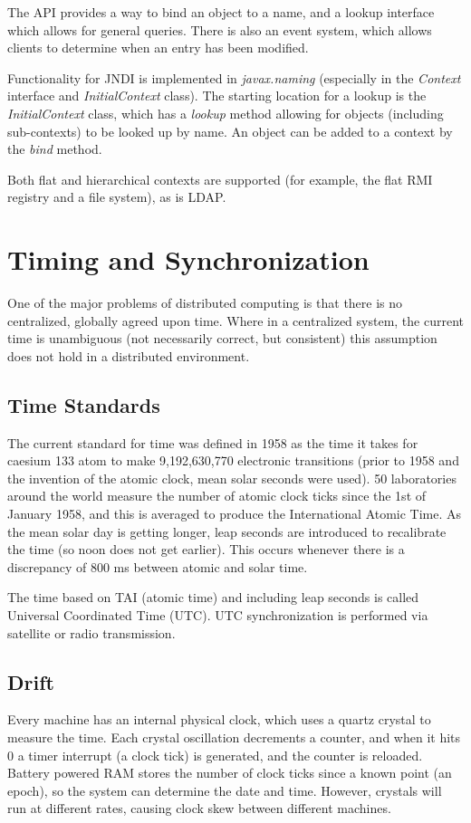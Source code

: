 \documentclass{article}
\begin{document}
The API provides a way to bind an object to a name, and a lookup interface which allows for general queries. There is also an event system, which allows clients to determine when an entry has been modified.

Functionality for JNDI is implemented in \textit{javax.naming} (especially in the \textit{Context} interface and \textit{InitialContext} class). The starting location for a lookup is the \textit{InitialContext} class, which has a \textit{lookup} method allowing for objects (including sub-contexts) to be looked up by name. An object can be added to a context by the \textit{bind} method. 

Both flat and hierarchical contexts are supported (for example, the flat RMI registry and a file system), as is LDAP.

\section{Timing and Synchronization}
One of the major problems of distributed computing is that there is no centralized, globally agreed upon time. Where in a centralized system, the current time is unambiguous (not necessarily correct, but consistent) this assumption does not hold in a distributed environment. 

\subsection{Time Standards}
The current standard for time was defined in 1958 as the time it takes for caesium 133 atom to make 9,192,630,770 electronic transitions (prior to 1958 and the invention of the atomic clock, mean solar seconds were used). 50 laboratories around the world measure the number of atomic clock ticks since the 1st of January 1958, and this is averaged to produce the International Atomic Time. As the mean solar day is getting longer, leap seconds are introduced to recalibrate the time (so noon does not get earlier). This occurs whenever there is a discrepancy of 800 ms between atomic and solar time.

The time based on TAI (atomic time) and including leap seconds is called Universal Coordinated Time (UTC). UTC synchronization is performed via satellite or radio transmission.

\subsection{Drift}
Every machine has an internal physical clock, which uses a quartz crystal to measure the time. Each crystal oscillation decrements a counter, and when it hits 0 a timer interrupt (a clock tick) is generated, and the counter is reloaded. Battery powered RAM stores the number of clock ticks since a known point (an epoch), so the system can determine the date and time. However, crystals will run at different rates, causing clock skew between different machines.
\end{document}
